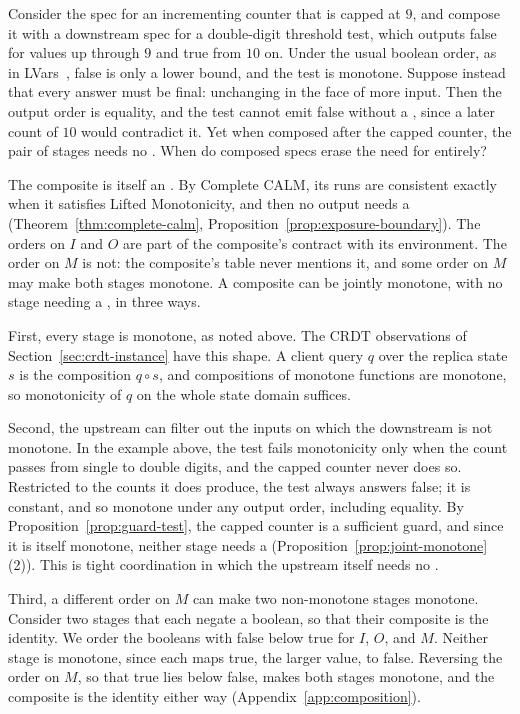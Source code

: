 Consider the spec for an incrementing counter that is capped at $9$, and
compose it with a downstream spec for a double-digit threshold test, which
outputs \textsf{false} for values up through $9$ and \textsf{true} from $10$ on.
Under the usual boolean order, as in LVars~\cite{kuper2013lvars}, \textsf{false}
is only a lower bound, and the test is monotone.  Suppose instead that every
answer must be final: unchanging in the face of more input.  Then the output order is equality, and the test cannot
emit \textsf{false} without a \commitment, since a later count of $10$ would
contradict it.  Yet when composed after the capped counter, the pair of
stages needs no \commitment.  When do composed specs erase the need for
\commitment entirely?

The composite is itself an \spectype.  By Complete CALM, its runs are
consistent exactly when it satisfies Lifted Monotonicity, and then no output needs a
\commitment (Theorem~\ref{thm:complete-calm},
Proposition~\ref{prop:exposure-boundary}).  The orders on $I$ and $O$ are part
of the composite's contract with its environment.  The order on $M$ is not:
the composite's table never mentions it, and some order on $M$ may make both
stages monotone.  A composite can be jointly monotone, with no stage needing a
\commitment, in three ways.

First, every stage is monotone, as noted above.  The CRDT observations of Section~\ref{sec:crdt-instance} have this shape.  A
client query $q$ over the replica state $s$ is the composition $q\circ s$, and
compositions of monotone functions are monotone, so monotonicity of $q$ on the
whole state domain suffices.

Second, the upstream can filter out the inputs on which the downstream is not
monotone.  In the example above, the test fails monotonicity only when the
count passes from single to double digits, and the capped counter never does
so.  Restricted to the counts it does produce, the test always answers
\textsf{false}; it is constant, and so monotone under any output order,
including equality.  By Proposition~\ref{prop:guard-test}, the capped counter
is a sufficient guard, and since it is itself monotone, neither stage needs
a \commitment (Proposition~\ref{prop:joint-monotone}(2)).  This is tight
coordination in which the upstream itself needs no \commitment.

Third, a different order on $M$ can make two non-monotone stages monotone.
Consider two stages that each negate a boolean, so that their composite is the
identity.  We order the booleans with false below true for $I$, $O$, and $M$.
Neither stage is monotone, since each maps true, the larger value, to false.
Reversing the order on $M$, so that true lies below false, makes both stages
monotone, and the composite is the identity either way
(Appendix~\ref{app:composition}).

